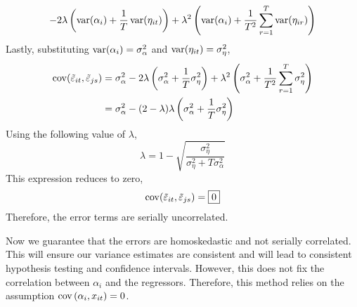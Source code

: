 \documentclass[12pt,twoside]{article}
\begin{document}
\begin{problems}
\begin{problemparts}
$$- 2\lambda\left(\operatorname{var}(\alpha_i) + \frac{1}{T}\operatorname{var}(\eta_{it})\right) +
\lambda^2\left(\operatorname{var}(\alpha_i) + \frac{1}{T^2}\sum_{r =
1}^T\operatorname{var}({\eta}_{ir})\right) $$
Lastly, substituting $\operatorname{var}(\alpha_i) = \sigma_\alpha^2$ and $\operatorname{var}(\eta_{it})
= \sigma_\eta^2$,
\begin{align*}
    \operatorname{cov}(\tilde{\varepsilon}_{it}, \tilde{\varepsilon}_{js}) &=
    \sigma_\alpha^2 - 2\lambda\left(\sigma_\alpha^2 +
    \frac{1}{T}\sigma_\eta^2\right) + \lambda^2\left(\sigma_\alpha^2 +
    \frac{1}{T^2}\sum_{r = 1}^T\sigma_\eta^2\right) \\
    &= \sigma_\alpha^2 - (2 - \lambda)\lambda\left(\sigma_\alpha^2 +
    \frac{1}{T}\sigma_\eta^2\right) \\
\end{align*}
Using the following value of $\lambda$,
$$ \lambda = 1 - \sqrt{\frac{\sigma_\eta^2}{\sigma_\eta^2 + T\sigma_\alpha^2}} $$
This expression reduces to zero,
$$ \operatorname{cov}(\tilde{\varepsilon}_{it}, \tilde{\varepsilon}_{js}) = \boxed{0} $$
Therefore, the error terms are serially uncorrelated.

\problempart  %

Now we guarantee that the errors are homoskedastic and not serially
correlated. This will ensure our variance estimates are consistent and will
lead to consistent hypothesis testing and confidence intervals. However, this
does not fix the correlation between $\alpha_i$ and the regressors.
Therefore, this method relies on the assumption $\operatorname{cov}\left(\alpha_i,
x_{it}\right) = 0$.

\problempart  %

\begin{enumerate}[label=\textbf{(\roman*)}]


\end{enumerate}
\end{problemparts}
\end{problems}
\end{document}
